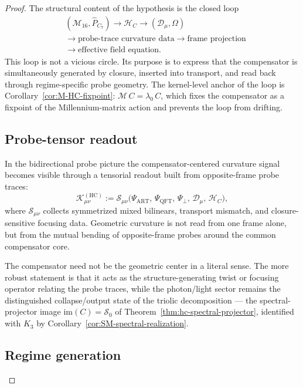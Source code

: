 \begin{proof}
The structural content of the hypothesis is the closed loop
\[
\begin{aligned}
&(\mathcal{M}_{16},\hat{P}_{C_7}) \longrightarrow \mathcal{H}_C \longrightarrow (\mathcal{D}_\mu,\Omega)\\
&\longrightarrow \text{probe-trace curvature data} \longrightarrow \text{frame projection}\\
&\longrightarrow \text{effective field equation}.
\end{aligned}
\]
This loop is not a vicious circle. Its purpose is to express that the
compensator is simultaneously generated by closure, inserted into
transport, and read back through regime-specific probe geometry.
The kernel-level anchor of the loop is
Corollary~\ref{cor:M-HC-fixpoint}: $\mathcal{M}\,C = \lambda_0\,C$,
which fixes the compensator as a fixpoint of the Millennium-matrix
action and prevents the loop from drifting.

\subsection*{Probe-tensor readout}

In the bidirectional probe picture the compensator-centered curvature
signal becomes visible through a tensorial readout built from
opposite-frame probe traces:
\[
  \mathcal{K}_{\mu\nu}^{(\mathrm{HC})}
  :=
  \mathcal{S}_{\mu\nu}
  \bigl(
    \Psi_{\mathrm{ART}},\,
    \Psi_{\mathrm{QFT}},\,
    \Psi_\perp,\,
    \mathcal{D}_\mu,\,
    \mathcal{H}_C
  \bigr),
\]
where $\mathcal{S}_{\mu\nu}$ collects symmetrized mixed bilinears,
transport mismatch, and closure-sensitive focusing data.
Geometric curvature is not read from one frame alone, but from the
mutual bending of opposite-frame probes around the common compensator
core.

\begin{remark}
The compensator need not be the geometric center in a literal sense.
The more robust statement is that it acts as the structure-generating
twist or focusing operator relating the probe traces, while the
photon/light sector remains the distinguished collapse/output state of
the triolic decomposition --- the spectral-projector image
$\mathrm{im}(C) = \mathcal{S}_0$ of Theorem~\ref{thm:hc-spectral-projector},
identified with $K_3$ by Corollary~\ref{cor:SM-spectral-realization}.
\end{remark}

\subsection*{Regime generation}


\end{proof}
